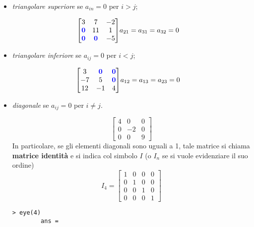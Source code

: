 \begin{defi}
\begin{itemize}
\begin{es}
\begin{equation*}
      \end{equation*}
    \end{es}
  \item \textit{triangolare superiore} se $a_{in}=0$ per $i>j$;
    \begin{es}
      \label{es:matrice4-3}
      \begin{eqnarray*}
        \begin{bmatrix}
          3 & 7 & -2\\
          \mathbf{\color{blue}0} & 11 & 1\\
          \mathbf{\color{blue}0} & \mathbf{\color{blue}0} & -5
        \end{bmatrix} & a_{21} = a_{31} = a_{32} = 0
      \end{eqnarray*}
    \end{es}
  \item \textit{triangolare inferiore} se $a_{ij}=0$ per $i<j$;
    \begin{es}
      \label{es:matrice4-4}
      \begin{eqnarray*}
        \begin{bmatrix}
          3 & \mathbf{\color{blue}0} & \mathbf{\color{blue}0}\\
          -7 & 5 & \mathbf{\color{blue}0}\\
          12 & -1 & 4
        \end{bmatrix} & a_{12}=a_{13}=a_{23}=0
      \end{eqnarray*}
    \end{es}
  \item \textit{diagonale} se $a_{ij}=0$ per $i\neq j$.
    \begin{es}
      \label{es:matrice4-5}
      \begin{equation*}
        \begin{bmatrix}
          4 & 0 & 0\\
          0 & -2 & 0\\
          0 & 0 & 9
        \end{bmatrix}
      \end{equation*}
      In particolare, se gli elementi diagonali sono uguali a 1, tale
      matrice si chiama \textbf{matrice identità} e si indica col simbolo
      $I$ (o $I_n$ se si vuole evidenziare il suo ordine)
      \begin{equation*}
        I_4=
        \begin{bmatrix}
          1 & 0 & 0 & 0\\
          0 & 1 & 0 & 0\\
          0 & 0 & 1 & 0\\
          0 & 0 & 0 & 1
        \end{bmatrix}
      \end{equation*}
      \begin{lstlisting}[caption=generare una matrice identità in GNU/Octave]
        > eye(4)
        ans =
        

\end{lstlisting}
\end{es}
\end{itemize}
\end{defi}
